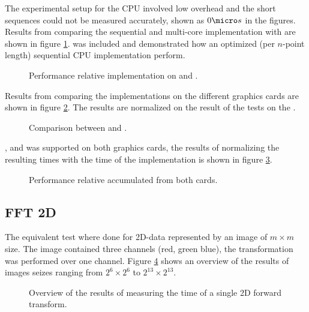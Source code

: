 The experimental setup for the CPU involved low overhead and the short sequences could not be measured accurately, shown as $0{\micro}s$ in the figures. Results from comparing the sequential {\CPP} and multi-core {\OMP} implementation with {\CU} are shown in figure \ref{fig:gtx:cpu}. {\FFTW} was included and demonstrated how an optimized (per $n$-point length) sequential CPU implementation perform.

\begin{figure}
	\centering
	
	\caption{Performance relative {\CU} implementation on {\NVCARD} and {\INTELCPU}.}
	\label{fig:gtx:cpu}
\end{figure}

Results from comparing the implementations on the different graphics cards are shown in figure \ref{fig:gpu-comparison}. The results are normalized on the result of the tests on the {\NVCARD}.

\begin{figure}
	\centering
	
	\caption{Comparison between {\AMDCARD} and {\NVCARD}.}
	\label{fig:gpu-comparison}
\end{figure}

{\DX}, {\GL} and {\OCL} was supported on both graphics cards, the results of normalizing the resulting times with the time of the {\OCL} implementation is shown in figure \ref{fig:gpu-comparison-tech}.

\begin{figure}
	\centering
	
	\caption{Performance relative {\OCL} accumulated from both cards.}
	\label{fig:gpu-comparison-tech}
\end{figure}


\newpage

\subsection{FFT 2D}

The equivalent test where done for 2D-data represented by an image of $m{\times}m$ size. The image contained three channels (red, green blue), the transformation was performed over one channel. Figure \ref{fig:gpu:overview-2d} shows an overview of the results of images seizes ranging from $2^{6}{\times}2^{6}$ to $2^{13}{\times}2^{13}$.

\begin{figure}
	\centering
	\subfloat[\NVCARD]{	
		
	}
	\vfill
	\subfloat[\AMDCARD]{
		
	}
	\caption{Overview of the results of measuring the time of a single 2D forward transform.}
	\label{fig:gpu:overview-2d}
\end{figure}

